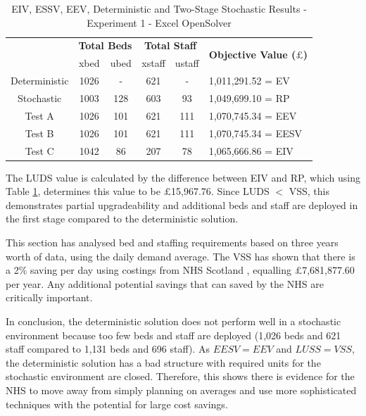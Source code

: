 \documentclass[../thesis.tex]{subfiles}
\begin{document}
\begin{table}[h!]
    \centering
    \begin{tabular}{cccccl}\toprule
 & \multicolumn{2}{l}{\textbf{Total Beds}} & \multicolumn{2}{c}{\textbf{Total Staff}} & \multirow{2}{*}{\textbf{Objective Value ($\pounds$)}}\\ \cmidrule(lr){2-3} \cmidrule(lr){4-5}
 & xbed           & ubed          & xstaff         & ustaff         \\ \midrule
      Deterministic & 1026 & - &  621 & - & 1,011,291.52 =  EV \\ \midrule
      Stochastic & 1003 & 128  & 603 & 93 & 1,049,699.10 = RP\\ \midrule
      Test A & 1026 & 101 & 621&  111 &  1,070,745.34 = EEV\\\midrule
      Test B & 1026 & 101 & 621&  111 &  1,070,745.34 = EESV\\\midrule
      Test C & 1042 & 86 &  207  & 78 &  1,065,666.86 = EIV \\\bottomrule
    \end{tabular}
    \caption{EIV, ESSV, EEV, Deterministic and Two-Stage Stochastic Results - Experiment 1 - Excel OpenSolver}
    \label{tab:eiveesveevdettwostageresults1}
\end{table}

The LUDS value is calculated by the difference between EIV and RP, which using Table \ref{tab:eiveesveevdettwostageresults1}, determines this value to be $\pounds$15,967.76. Since LUDS $<$ VSS, this demonstrates partial upgradeability and additional beds and staff are deployed in the first stage compared to the deterministic solution.

This section has analysed bed and staffing requirements based on three years worth of data, using the daily demand average. The VSS has shown that there is a 2\% saving per day using costings from NHS Scotland \cite{PHS2021}, equalling $\pounds$7,681,877.60 per year. Any additional potential savings that can saved by the NHS are critically important. 

In conclusion, the deterministic solution does not perform well in a stochastic environment because too few beds and staff are deployed (1,026 beds and 621 staff compared to 1,131 beds and 696 staff). As $EESV = EEV$ and $LUSS=VSS$, the deterministic solution has a bad structure with required units for the stochastic environment are closed. Therefore, this shows there is evidence for the NHS to move away from simply planning on averages and use more sophisticated techniques with the potential for large cost savings.
\end{document}
